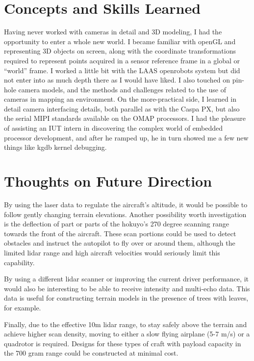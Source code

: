 \documentclass[a4paper,11pt]{report}
\begin{document}
\section{Concepts and Skills Learned}

Having never worked with cameras in detail and 3D modeling, I had the opportunity to enter a whole new world. I became familiar with openGL and representing 3D objects on screen, along with the coordinate transformations required to represent points acquired in a sensor reference frame in a global or ``world'' frame. I worked a little bit with the LAAS openrobots system but did not enter into as much depth there as I would have liked. I also touched on pin-hole camera models, and the methods and challenges related to the use of cameras in mapping an environment. On the more-practical side, I learned in detail camera interfacing details, both parallel as with the Caspa PX, but also the serial MIPI standards available on the OMAP processors. I had the pleasure of assisting an IUT intern in discovering the complex world of embedded processor development, and after he ramped up, he in turn showed me a few new things like kgdb kernel debugging.

\section{Thoughts on Future Direction}

By using the laser data to regulate the aircraft's altitude, it would be possible to follow gently changing terrain elevations. Another possibility worth investigation is the deflection of part or parts of the hokuyo's 270 degree scanning range towards the front of the aircraft. These scan portions could be used to detect obstacles and instruct the autopilot to fly over or around them, although the limited lidar range and high aircraft velocities would seriously limit this capability.

By using a different lidar scanner or improving the current driver performance, it would also be interesting to be able to receive intensity and multi-echo data. This data is useful for constructing terrain models in the presence of trees with leaves, for example.

Finally, due to the effective 10m lidar range, to stay safely above the terrain and achieve higher scan density, moving to either a slow flying airplane (5-7 m/s) or a quadrotor is required. Designs for these types of craft with payload capacity in the 700 gram range could be constructed at minimal cost. 
\end{document}
